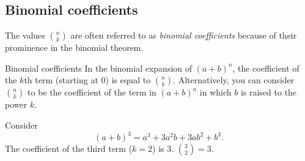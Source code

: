 \pagebreak
\subsection{Binomial coefficients}
The values $\binom{n}{k}$ are often referred to as \emph{binomial coefficients} because of their prominence in the binomial theorem.
\begin{bdef}{Binomial coefficients}
    In the binomial expansion of $(a+b)^n$, the coefficient of the $k$th term (starting at $0$) is equal to $\displaystyle \binom{n}{k}$. Alternatively, you can consider $\binom{n}{k}$ to be the coefficient of the term in $(a+b)^n$ in which $b$ is raised to the power $k$.
\end{bdef}

\begin{changebar}
    \begin{example}
        Consider \[
            (a + b)^3 = a^3 + 3a^2b + 3ab^2 + b^3.    
            \] The coefficient of the third term ($k = 2$) is $3$. $\binom{3}{2} = 3$.
        \end{example}
    \end{changebar}

